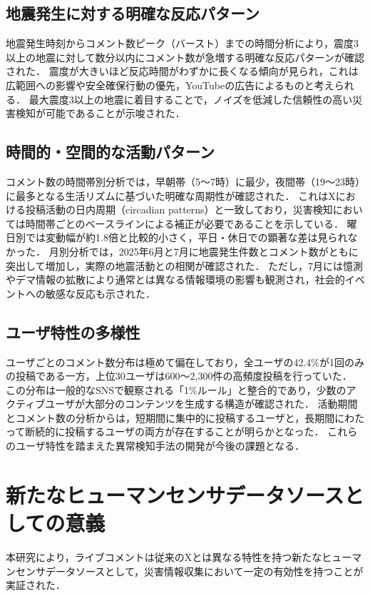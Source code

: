 \subsection{地震発生に対する明確な反応パターン}

地震発生時刻からコメント数ピーク（バースト）までの時間分析により，震度3以上の地震に対して数分以内にコメント数が急増する明確な反応パターンが確認された．
震度が大きいほど反応時間がわずかに長くなる傾向が見られ，これは広範囲への影響や安全確保行動の優先，YouTubeの広告によるものと考えられる．
最大震度3以上の地震に着目することで，ノイズを低減した信頼性の高い災害検知が可能であることが示唆された．

\subsection{時間的・空間的な活動パターン}

コメント数の時間帯別分析では，早朝帯（5〜7時）に最少，夜間帯（19〜23時）に最多となる生活リズムに基づいた明確な周期性が確認された．
これはXにおける投稿活動の日内周期（circadian patterns）と一致しており，災害検知においては時間帯ごとのベースラインによる補正が必要であることを示している．
曜日別では変動幅が約1.8倍と比較的小さく，平日・休日での顕著な差は見られなかった．
月別分析では，2025年6月と7月に地震発生件数とコメント数がともに突出して増加し，実際の地震活動との相関が確認された．
ただし，7月には憶測やデマ情報の拡散により通常とは異なる情報環境の影響も観測され，社会的イベントへの敏感な反応も示された．

\subsection{ユーザ特性の多様性}

ユーザごとのコメント数分布は極めて偏在しており，全ユーザの42.4\%が1回のみの投稿である一方，上位30ユーザは600〜2,300件の高頻度投稿を行っていた．
この分布は一般的なSNSで観察される「1\%ルール」と整合的であり，少数のアクティブユーザが大部分のコンテンツを生成する構造が確認された．
活動期間とコメント数の分析からは，短期間に集中的に投稿するユーザと，長期間にわたって断続的に投稿するユーザの両方が存在することが明らかとなった．
これらのユーザ特性を踏まえた異常検知手法の開発が今後の課題となる．

\section{新たなヒューマンセンサデータソースとしての意義}

本研究により，ライブコメントは従来のXとは異なる特性を持つ新たなヒューマンセンサデータソースとして，災害情報収集において一定の有効性を持つことが実証された．

